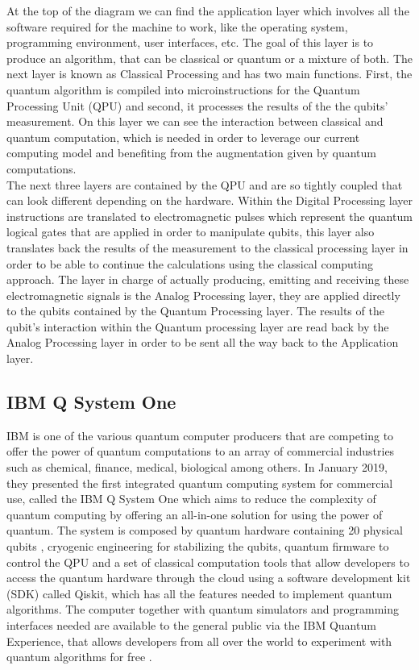 \documentclass[12pt,a4paper]{scrartcl}
\begin{document}
At the top of the diagram we can find the application layer which involves all the software required for the machine to work, like the operating system, programming environment, user interfaces, etc. The goal of this layer is to produce an algorithm, that can be classical or quantum or a mixture of both. The next layer is known as Classical Processing and has two main functions. First, the quantum algorithm is compiled into microinstructions for the Quantum Processing Unit (QPU) and second, it processes the results of the the qubits' measurement. On this layer we can see the interaction between classical and quantum computation, which is needed in order to leverage our current computing model and benefiting from the augmentation given by quantum computations.\\

The next three layers are contained by the QPU and are so tightly coupled that can look different depending on the hardware. Within the Digital Processing layer instructions are translated to electromagnetic pulses which represent the quantum logical gates that are applied in order to manipulate qubits, this layer also translates back the results of the measurement to the classical processing layer in order to be able to continue the calculations using the classical computing approach. The layer in charge of actually producing, emitting and receiving these electromagnetic signals is the Analog Processing layer, they are applied directly to the qubits contained by the Quantum Processing layer. The results of the qubit's interaction within the Quantum processing layer are read back by the Analog Processing layer in order to be sent all the way back to the Application layer.

\subsection{IBM Q System One}

IBM is one of the various quantum computer producers that are competing to offer the power of quantum computations to an array of commercial industries such as chemical, finance, medical, biological among others. In January 2019, they presented the first integrated quantum computing system for commercial use, called the IBM Q System One \cite{IBMPress012019} which aims to reduce the complexity of quantum computing by offering an all-in-one solution for using the power of quantum. The system is composed by quantum hardware containing 20 physical qubits \cite{HCP2019}, cryogenic engineering for stabilizing the qubits, quantum firmware to control the QPU and a set of classical computation tools that allow developers to access the quantum hardware through the cloud using a software development kit (SDK) called Qiskit, which has all the features needed to implement quantum algorithms. The computer together with quantum simulators and programming interfaces needed are available to the general public via the IBM Quantum Experience, that allows developers from all over the world to experiment with quantum algorithms for free \cite{ibm-q-e}.
\end{document}
